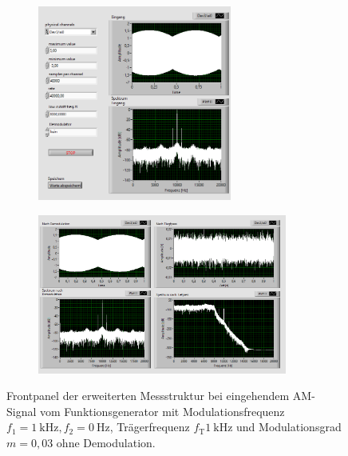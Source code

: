 \newpage
\pagestyle{empty}
\begin{figure}[H]
	\centering
	\begin{subfigure}[c]{\textwidth}
		\centering
		\includegraphics[width=0.7\textwidth]{pic/dam_keine1.png}
	\end{subfigure}
	\begin{subfigure}[c]{\textwidth}
		\centering
		\includegraphics[width=0.9\textwidth]{pic/dam_keine2.png}
	\end{subfigure}	
	\caption{Frontpanel der erweiterten Messstruktur bei eingehendem AM-Signal vom Funktionsgenerator mit Modulationsfrequenz $f_1= \SI{1}{\kilo\hertz}, f_2 = \SI{0}{\hertz}$, Trägerfrequenz $f_\text{T}\SI{1}{\kilo\hertz}$ und Modulationsgrad $m = 0,03$ ohne Demodulation.}
	\label{fig:dam_keine}	
\end{figure} 

